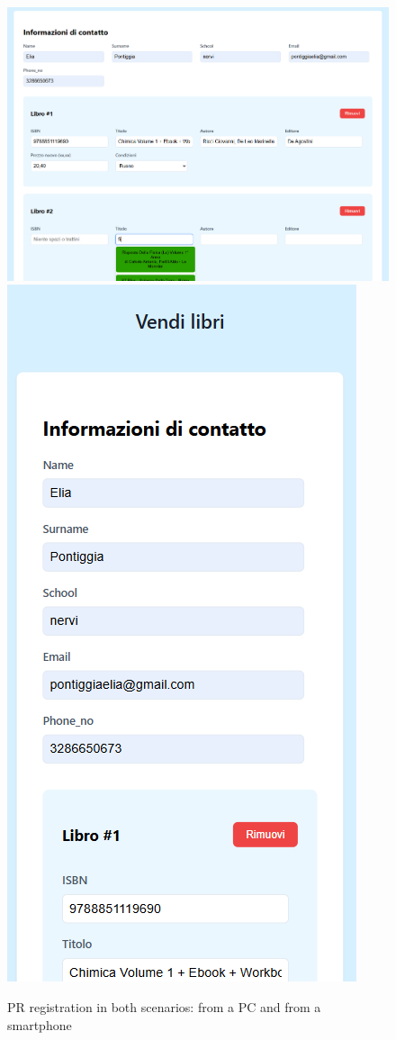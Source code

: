 \begin{figure}[ht]
    \centering
    \includegraphics[width=.65\textwidth]{assets/ui_mockup/booksubmissionform.png}
    \includegraphics[width=.30\textwidth]{assets/ui_mockup/booksubmissionsmartphone.png}
    \caption{PR registration in both scenarios: from a PC and from a smartphone}
    \label{fig:booksubmissionform}
\end{figure}